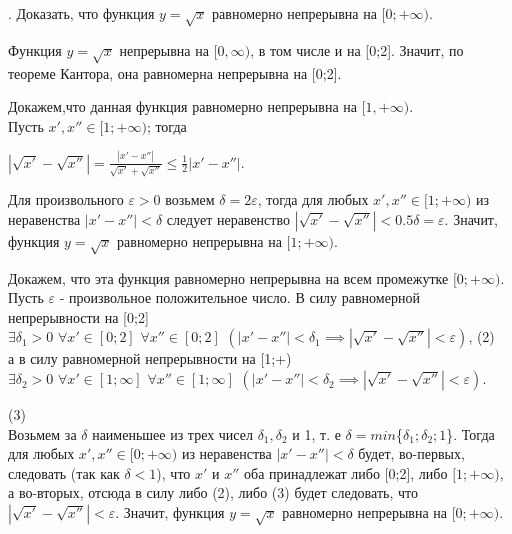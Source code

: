\documentclass[12pt]{article}
\begin{document}
. Доказать, что функция $y=\sqrt{x}$ равномерно непрерывна на $[0;+\infty)$. 

\quad Функция $y = \sqrt{x}$ непрерывна на $[0,\infty)$, в том числе и на [0;2]. 
Значит, по теореме Кантора, она равномерна непрерывна на [0;2].

\newpage
\setlength{\headsep}{0.8cm}

\pagestyle{fancy}
\fancyhf{} 
\fancyhead[C]{\fontsize{14pt}{skip}\selectfont\itshape\rightmark}
Докажем,что данная функция равномерно непрерывна на $[1,+\infty)$.\\
Пусть $x', x'' \in [1;+\infty)$; тогда
\begin{center}
    $|\sqrt{x'} - \sqrt{x''}| = \frac{|x' - x''|}{\sqrt{x'} + \sqrt{x''}} \leq \frac{1}{2} |x' - x''|.$
\end{center}
Для произвольного $\varepsilon > 0$ возьмем $\delta = 2\varepsilon$, тогда для любых $x',x'' \in [1;+\infty)$ из неравенства $|x' - x''| < \delta$ следует неравенство $|\sqrt{x'} - \sqrt{x''}| < 0.5 \delta = \varepsilon.$ Значит, функция $y = \sqrt{x}$ равномерно непрерывна на $[1;+\infty).$

\quad Докажем, что эта функция равномерно непрерывна на всем промежутке $[0;+\infty).$ Пусть $\varepsilon$ - произвольное положительное число. В силу равномерной непрерывности на [0;2] \\
$\exists \delta_1 > 0$ $ \forall x' \in [0;2]$ $ \forall x'' \in [0;2]$ $(|x' - x''| < \delta_1 \implies | \sqrt{x'} - \sqrt{x''}| < \varepsilon)$, (2)\\
а в силу равномерной непрерывности на [1;+\infty)\\
$\exists \delta_2 > 0$ $ \forall x' \in [1;\infty]$ $ \forall x'' \in [1;\infty]$ $(|x' - x''| < \delta_2 \implies | \sqrt{x'} - \sqrt{x''}| < \varepsilon)$.

\quad \quad \quad \quad \quad \quad \quad \quad \quad \quad \quad \quad \quad \quad \quad \quad \quad \quad \quad \quad \quad \quad \quad \quad \quad \quad \quad \quad \quad \quad (3) \\
Возьмем за $\delta$ наименьшее из трех чисел $\delta_1, \delta_2$ и 1, т. е $\delta = min $\{$ \delta_1;\delta_2;1$\}. Тогда для любых $x',x'' \in [0;+\infty)$ из неравенства $|x' - x''| < \delta$ будет, во-первых, следовать (так как $\delta < 1$), что $x'$ и $x''$ оба принадлежат либо [0;2], либо $[1;+\infty)$, а во-вторых, отсюда в силу либо (2), либо (3) будет следовать, что $|\sqrt{x'} - \sqrt{x''}| < \varepsilon$. Значит, функция $y=\sqrt{x}$ равномерно непрерывна на $[0;+\infty).$ 
\end{document}

